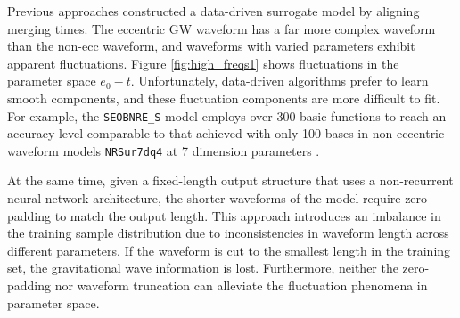 \documentclass[
reprint,
superscriptaddress,
amsmath,amssymb,
aps,
prd,
floatfix,
]{revtex4-2}
\begin{document}
Previous approaches constructed a data-driven surrogate model by aligning merging times. 
The eccentric GW waveform has a far more complex waveform than the non-ecc waveform, and waveforms with varied parameters exhibit apparent fluctuations. Figure \ref{fig:high_freqs1} shows fluctuations in the parameter space $e_0-t$.
Unfortunately, data-driven algorithms prefer to learn smooth components, and these fluctuation components are more difficult to fit. 
For example, the \texttt{SEOBNRE\_S} model employs over 300 basic functions to reach an accuracy level comparable to that achieved with only 100 bases in non-eccentric waveform models \texttt{NRSur7dq4} at 7 dimension parameters \cite{varmaSurrogateModelsPrecessing2019}. 

At the same time, given a fixed-length output structure that uses a non-recurrent neural network architecture, the shorter waveforms of the model require zero-padding to match the output length. 
This approach introduces an imbalance in the training sample distribution due to inconsistencies in waveform length across different parameters. 
If the waveform is cut to the smallest length in the training set, the gravitational wave information is lost. 
Furthermore, neither the zero-padding nor waveform truncation can alleviate the fluctuation phenomena in parameter space.

\end{document}
